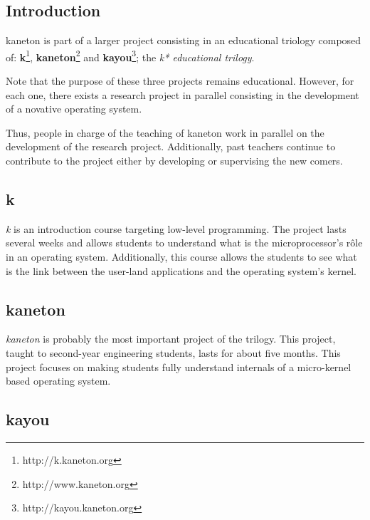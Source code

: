 \begin{multicols}{2}

%
%

\section{Introduction}

kaneton is part of a larger project consisting in an educational
triology composed of:
  \textbf{k}\footnote{http://k.kaneton.org},
  \textbf{kaneton}\footnote{http://www.kaneton.org} and
  \textbf{kayou}\footnote{http://kayou.kaneton.org}; the
\textit{k* educational trilogy}.

Note that the purpose of these three projects remains educational. However,
for each one, there exists a research project in parallel consisting in the
development of a novative operating system.

Thus, people in charge of the teaching of kaneton work in parallel on the
development of the research project. Additionally, past teachers continue
to contribute to the project either by developing or supervising the
new comers.

%
%

\subsection{k}

\textit{k} is an introduction course targeting low-level programming. The
project lasts several weeks and allows students to understand what is the
microprocessor's r\^ole in an operating system. Additionally, this course
allows the students to see what is the link between the user-land applications
and the operating system's kernel.

%
%

\subsection{kaneton}

\textit{kaneton} is probably the most important project of the trilogy. This
project, taught to second-year engineering students, lasts for about five
months. This project focuses on making students fully understand
internals of a micro-kernel based operating system.

%
%

\subsection{kayou}


\end{multicols}
